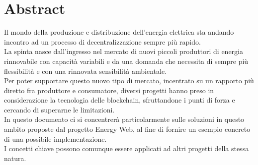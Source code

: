 \chapter*{Abstract}

Il mondo della produzione e distribuzione dell'energia elettrica sta andando incontro ad un processo di decentralizzazione sempre più rapido. \\
La spinta nasce dall'ingresso nel mercato di nuovi piccoli produttori di energia rinnovabile con capacità variabili e 
da una domanda che necessita di sempre più flessibilità e con una rinnovata sensibilità ambientale. \\
Per poter supportare questo nuovo tipo di mercato, incentrato su un rapporto più diretto fra produttore e consumatore, 
diversi progetti hanno preso in considerazione la tecnologia delle blockchain, sfruttandone i punti di forza e cercando di superarne le limitazioni. \\
In questo documento ci si concentrerà particolarmente sulle soluzioni in questo ambito proposte dal progetto Energy Web, 
al fine di fornire un esempio concreto di una possibile implementazione. \\
I concetti chiave possono comunque essere applicati ad altri progetti della stessa natura.